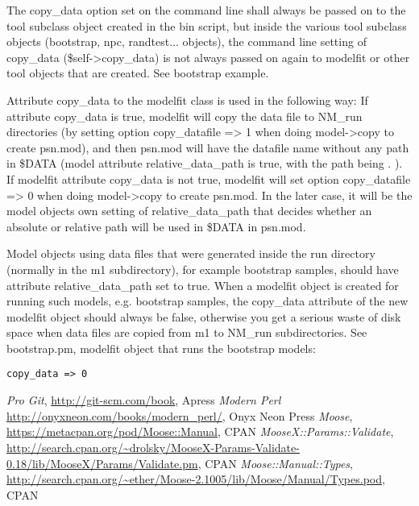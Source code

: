 The copy\_data option set on the command line shall always be passed on to the tool subclass object created in the bin script, but inside the various tool subclass objects (bootstrap, npc, randtest... objects), the command line setting of copy\_data (\$self->copy\_data) is not always passed on again to modelfit or other tool objects
that are created. See bootstrap example.

Attribute copy\_data to the modelfit class is used in the following way:
If attribute copy\_data is true, modelfit will copy the data file
to NM\_run directories (by setting option copy\_datafile => 1 when doing model->copy to create psn.mod),
and then psn.mod will have the datafile name without any path in \$DATA (model attribute relative\_data\_path is true, with
the path being . ). If modelfit attribute copy\_data is not true, 
modelfit will set option copy\_datafile => 0 when doing model->copy to create psn.mod.
In the later case, it will be the model objects own setting of relative\_data\_path that decides
whether an absolute or relative path will be used in \$DATA in psn.mod.

Model objects using data files that were generated inside the run directory (normally in the m1 subdirectory), 
for example bootstrap samples, should have attribute relative\_data\_path set to true.
When a modelfit object is created for running such models, e.g. bootstrap samples,
the copy\_data attribute of the new modelfit object should always be false, otherwise you get a serious waste of disk space
when data files are copied from m1 to NM\_run subdirectories.
See bootstrap.pm, modelfit object that runs the bootstrap models:
\begin{verbatim}
copy_data => 0
\end{verbatim}


\begin{thebibliography}{1}
	 {\em Pro Git}, \url{http://git-scm.com/book}, Apress
	 {\em Modern Perl} \url{http://onyxneon.com/books/modern_perl/}, Onyx Neon Press
	 {\em Moose}, \url{https://metacpan.org/pod/Moose::Manual}, CPAN
	 {\em MooseX::Params::Validate}, \url{http://search.cpan.org/\~drolsky/MooseX-Params-Validate-0.18/lib/MooseX/Params/Validate.pm}, CPAN
	 {\em Moose::Manual::Types}, \url{http://search.cpan.org/~ether/Moose-2.1005/lib/Moose/Manual/Types.pod}, CPAN
\end{thebibliography}



